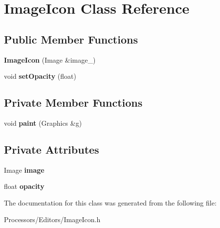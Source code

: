 \hypertarget{classImageIcon}{\section{Image\-Icon Class Reference}
\label{classImageIcon}
}
\subsection*{Public Member Functions}
\begin{DoxyCompactItemize}
\item 
\hypertarget{classImageIcon_a02707e8134452585d3a0a915928547d1}{{\bfseries Image\-Icon} (Image \&image\-\_\-)}\label{classImageIcon_a02707e8134452585d3a0a915928547d1}

\item 
\hypertarget{classImageIcon_a6b38b917770b9c5c1b6469efd4c89138}{void {\bfseries set\-Opacity} (float)}\label{classImageIcon_a6b38b917770b9c5c1b6469efd4c89138}

\end{DoxyCompactItemize}
\subsection*{Private Member Functions}
\begin{DoxyCompactItemize}
\item 
\hypertarget{classImageIcon_ab12ecd9ab8c6f1a576b217df0ad64659}{void {\bfseries paint} (Graphics \&g)}\label{classImageIcon_ab12ecd9ab8c6f1a576b217df0ad64659}

\end{DoxyCompactItemize}
\subsection*{Private Attributes}
\begin{DoxyCompactItemize}
\item 
\hypertarget{classImageIcon_a09184ff95a20d7bb92654bf9ed3cc71e}{Image {\bfseries image}}\label{classImageIcon_a09184ff95a20d7bb92654bf9ed3cc71e}

\item 
\hypertarget{classImageIcon_aedd60183e8c61a72d7a350c506aea662}{float {\bfseries opacity}}\label{classImageIcon_aedd60183e8c61a72d7a350c506aea662}

\end{DoxyCompactItemize}


The documentation for this class was generated from the following file\-:\begin{DoxyCompactItemize}
\item 
Processors/\-Editors/Image\-Icon.\-h\end{DoxyCompactItemize}

